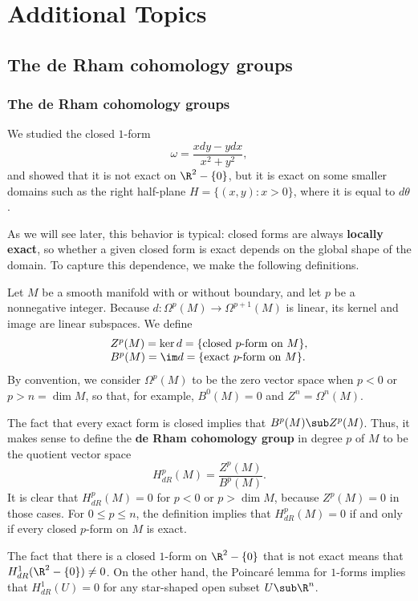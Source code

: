 \chapter{Additional Topics}
\section{The de Rham cohomology groups}
\subsection{The de Rham cohomology groups}
We studied the closed $1$-form
\[\omega=\frac{xdy-ydx}{x^2+y^2},\]
and showed that it is not exact on $\R^2-\{0\}$, but it is exact on some smaller domains such as the right half-plane $H=\{(x,y):x>0\}$, where it is equal to $d\theta$.\par
As we will see later, this behavior is typical: closed forms are always \textbf{locally exact}, so whether a given closed form is exact depends on the global shape of the domain. To capture this dependence, we make the following definitions.\par
Let $M$ be a smooth manifold with or without boundary, and let $p$ be a nonnegative integer. Because $d:\Omega^p(M)\to\Omega^{p+1}(M)$ is linear, its kernel and image are
linear subspaces. We define
\[\begin{array}{l}Z^p(M)=\ker d=\{\text{closed $p$-form on $M$}\},\\
B^p(M)=\im d=\{\text{exact $p$-form on $M$}\}.
\end{array}\]
By convention, we consider $\Omega^p(M)$ to be the zero vector space when $p<0$ or $p>n=\dim M$, so that, for example, $B^0(M)=0$ and $Z^n=\Omega^n(M)$.\par
The fact that every exact form is closed implies that $B^p(M)\sub Z^p(M)$. Thus, it makes sense to define the \textbf{de Rham cohomology group} in degree $p$ of $M$ to be the quotient vector space
\[H^p_{dR}(M)=\frac{Z^p(M)}{B^p(M)}.\]
It is clear that $H^p_{dR}(M)=0$ for $p<0$ or $p>\dim M$, because $Z^p(M)=0$ in those cases. For $0\leq p\leq n$, the definition implies that $H^p_{dR}(M)=0$ if and only if every closed $p$-form on $M$ is exact.
\begin{example}
The fact that there is a closed $1$-form on $\R^2-\{0\}$ that is not exact means that $H^1_{dR}(\R^2-\{0\})\neq 0$. On the other hand, the Poincar\'e lemma for $1$-forms 
implies that $H^1_{dR}(U)=0$ for any star-shaped open subset $U\sub\R^n$.
\end{example}
